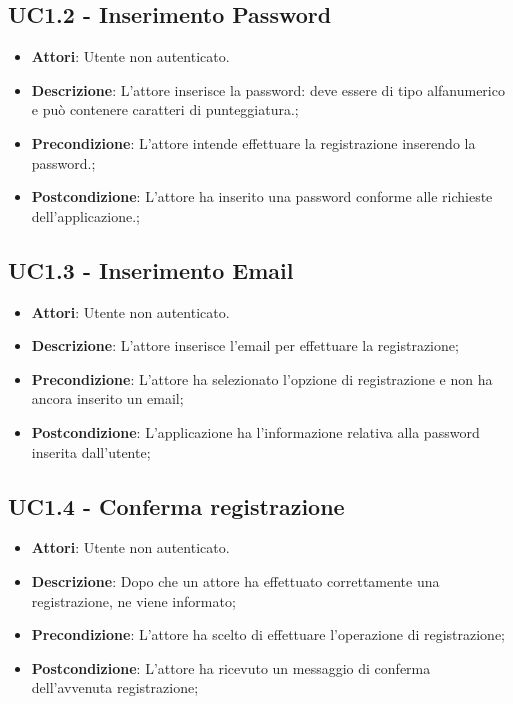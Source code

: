 \subsection{UC1.2 - Inserimento Password} 
\label{ssec:UC1.2} 
\begin{itemize} 
\item \textbf{Attori}: Utente non autenticato.
\item \textbf{Descrizione}: L’attore inserisce la password: deve essere di tipo alfanumerico e può contenere caratteri di punteggiatura.;
\item \textbf{Precondizione}: L'attore intende effettuare la registrazione inserendo la password.;
\item \textbf{Postcondizione}: L'attore ha inserito una password conforme alle richieste dell'applicazione.;
\end{itemize} 
\subsection{UC1.3 - Inserimento Email} 
\label{ssec:UC1.3} 
\begin{itemize} 
\item \textbf{Attori}: Utente non autenticato.
\item \textbf{Descrizione}: L’attore inserisce l'email per effettuare la registrazione;
\item \textbf{Precondizione}: L'attore ha selezionato l'opzione di registrazione e non ha ancora inserito un email;
\item \textbf{Postcondizione}: L'applicazione ha l’informazione relativa alla password inserita dall’utente;
\end{itemize} 
\subsection{UC1.4 - Conferma registrazione} 
\label{ssec:UC1.4} 
\begin{itemize} 
\item \textbf{Attori}: Utente non autenticato.
\item \textbf{Descrizione}: Dopo che un attore ha effettuato correttamente una registrazione, ne viene informato;
\item \textbf{Precondizione}: L'attore ha scelto di effettuare l'operazione di registrazione;
\item \textbf{Postcondizione}: L'attore ha ricevuto un messaggio di conferma dell'avvenuta registrazione;
\end{itemize} 
